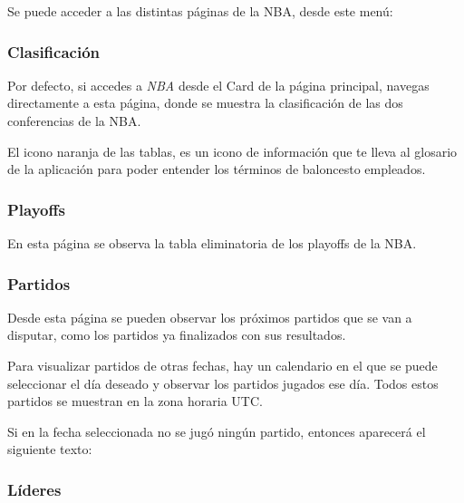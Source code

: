 Se puede acceder a las distintas páginas de la NBA, desde este menú:

\subsubsection{Clasificación}

Por defecto, si accedes a \textit{NBA} desde el Card de la página principal, navegas directamente a esta página, donde se muestra la clasificación de las dos conferencias de la NBA.


El icono naranja de las tablas, es un icono de información que te lleva al glosario de la aplicación para poder entender los términos de baloncesto empleados.


\subsubsection{Playoffs}

En esta página se observa la tabla eliminatoria de los playoffs de la NBA.



\subsubsection{Partidos}

Desde esta página se pueden observar los próximos partidos que se van a disputar, como los partidos ya finalizados con sus resultados.


Para visualizar partidos de otras fechas, hay un calendario en el que se puede seleccionar el día deseado y observar los partidos jugados ese día. Todos estos partidos se muestran en la zona horaria UTC.


Si en la fecha seleccionada no se jugó ningún partido, entonces aparecerá el siguiente texto:

\hfill

\subsubsection{Líderes}

